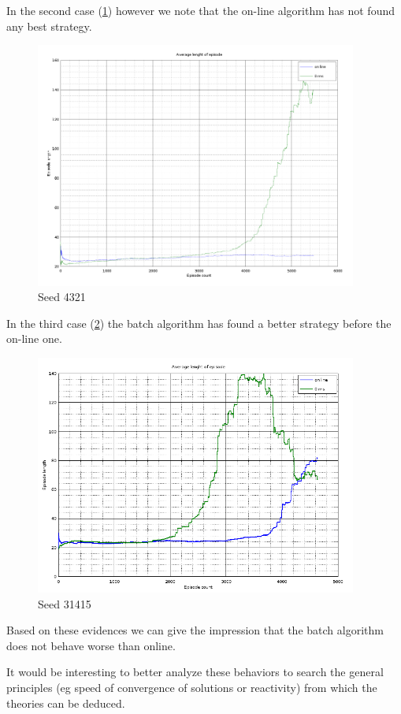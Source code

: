\documentclass[a4paper,11pt]{article}
\begin{document}
In the second case (\ref{fig:seed4321}) however we note that the on-line algorithm has not found any best strategy.

\begin{figure}
	\label{fig:seed4321}
	\includegraphics[width=300pt]{episodes-321}
	\caption{Seed 4321}
\end{figure}

In the third case (\ref{fig:seed31415}) the batch algorithm has found a better strategy before the on-line one.

\begin{figure}
	\label{fig:seed31415}
	\includegraphics[width=300pt]{episodes-314}
	\caption{Seed 31415}
\end{figure}

Based on these evidences we can give the impression that the batch algorithm does not behave worse than online.

It would be interesting to better analyze these behaviors to search the general principles (eg speed of convergence of solutions or reactivity) from which the theories can be deduced.
\end{document}
